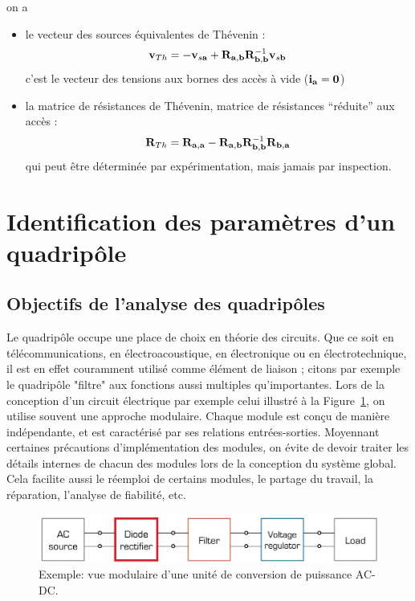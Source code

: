 on a 
\begin{itemize}
	\item le vecteur des sources équivalentes de Thévenin :
	\[{\bf v}_{Th}=-{\bf v}_{s{\bf a}}+{\bf R}_{\bf a,b}{\bf R}_{\bf b,b}^{-1}{\bf
		v}_{s{\bf b}}\]
	c'est le vecteur des tensions  aux bornes des accès à vide
	(${\bf i}_{\bf a}={\bf 0}$)
	\item la matrice de résistances de Thévenin, 
	matrice de résistances ``réduite'' aux accès :
	\[{\bf R}_{Th}={\bf R}_{\bf a,a}-{\bf R}_{\bf a,b}{\bf R}_{\bf b,b}^{-1}{\bf
		R}_{\bf b,a}\]
	qui peut être déterminée par expérimentation, mais jamais par inspection.
\end{itemize}

\section{Identification des paramètres d'un quadripôle}


\subsection{Objectifs de l'analyse des quadripôles}

Le quadripôle occupe une place de choix en théorie des circuits.
Que ce soit en télécommunications, en électroacoustique, en électronique ou en électrotechnique, il est
en effet couramment utilisé comme élément de liaison ; citons par exemple le quadripôle
"filtre" aux fonctions aussi multiples qu'importantes.
Lors de la conception d'un circuit électrique par exemple celui illustré à la Figure~\ref{fig:exemple}, on utilise souvent une approche modulaire. Chaque module est conçu de manière indépendante, et est caractérisé par ses relations entrées-sorties. Moyennant certaines précautions d'implémentation des modules, on évite de devoir traiter les détails internes de chacun des modules lors de la conception du système global. Cela facilite aussi le réemploi de certains modules, le partage du travail, la réparation, l'analyse de fiabilité, etc.
\begin{figure}[ht]
\centering
\includegraphics[width=0.95\linewidth]{figs/QP/exemple}
\caption{Exemple: vue modulaire d'une unité de conversion de puissance AC-DC.}
\label{fig:exemple}
\end{figure}

